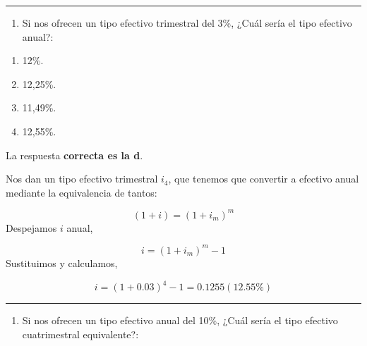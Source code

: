 \documentclass[
  letterpaper,
  DIV=11,
  numbers=noendperiod]{scrreprt}
\providecommand{\tightlist}{%
  \setlength{\itemsep}{0pt}\setlength{\parskip}{0pt}}\usepackage{longtable,booktabs,array}
\begin{document}
\begin{center}\rule{0.5\linewidth}{0.5pt}\end{center}

\begin{enumerate}
\def\labelenumi{\arabic{enumi}.}
\setcounter{enumi}{56}
\tightlist
\item
  Si nos ofrecen un tipo efectivo trimestral del 3\%, ¿Cuál sería el
  tipo efectivo anual?:
\end{enumerate}

\begin{enumerate}
\def\labelenumi{\alph{enumi}.}
\item
  12\%.
\item
  12,25\%.
\item
  11,49\%.
\item
  12,55\%.
\end{enumerate}

\begin{tcolorbox}[enhanced jigsaw, left=2mm, opacityback=0, colback=white, breakable, arc=.35mm, bottomrule=.15mm, rightrule=.15mm, toprule=.15mm, leftrule=.75mm, colframe=quarto-callout-tip-color-frame]
\begin{minipage}[t]{5.5mm}
\textcolor{quarto-callout-tip-color}{\faLightbulb}
\end{minipage}%
\begin{minipage}[t]{\textwidth - 5.5mm}

La respuesta \textbf{correcta es la d}.

Nos dan un tipo efectivo trimestral \(i_4\), que tenemos que convertir a
efectivo anual mediante la equivalencia de tantos:

\[\left(1+i\right)=\left(1+i_m\right)^m\] Despejamos \(i\) anual,

\[i=\left(1+i_m\right)^m-1\] Sustituimos y calculamos,

\[i=\left(1+0.03\right)^4-1=0.1255(12.55\%)\]

\end{minipage}%
\end{tcolorbox}

\begin{center}\rule{0.5\linewidth}{0.5pt}\end{center}

\begin{enumerate}
\def\labelenumi{\arabic{enumi}.}
\setcounter{enumi}{56}
\tightlist
\item
  Si nos ofrecen un tipo efectivo anual del 10\%, ¿Cuál sería el tipo
  efectivo cuatrimestral equivalente?:
\end{enumerate}
\end{document}
